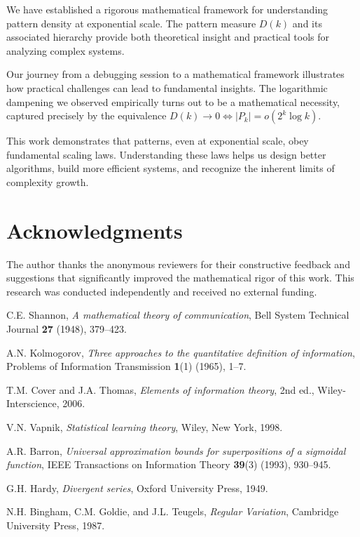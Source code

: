 \documentclass[11pt]{article}
\theoremstyle{definition}
\begin{document}
We have established a rigorous mathematical framework for understanding pattern density at exponential scale. The pattern measure $D(k)$ and its associated hierarchy provide both theoretical insight and practical tools for analyzing complex systems.

Our journey from a debugging session to a mathematical framework illustrates how practical challenges can lead to fundamental insights. The logarithmic dampening we observed empirically turns out to be a mathematical necessity, captured precisely by the equivalence $D(k)\to 0\iff |P_k|=o(2^k\log k)$.

This work demonstrates that patterns, even at exponential scale, obey fundamental scaling laws. Understanding these laws helps us design better algorithms, build more efficient systems, and recognize the inherent limits of complexity growth.

\section*{Acknowledgments}

The author thanks the anonymous reviewers for their constructive feedback and suggestions that significantly improved the mathematical rigor of this work. This research was conducted independently and received no external funding.

\begin{thebibliography}{99}

 C.E. Shannon, \emph{A mathematical theory of communication}, Bell System Technical Journal \textbf{27} (1948), 379--423.

 A.N. Kolmogorov, \emph{Three approaches to the quantitative definition of information}, Problems of Information Transmission \textbf{1}(1) (1965), 1--7.

 T.M. Cover and J.A. Thomas, \emph{Elements of information theory}, 2nd ed., Wiley-Interscience, 2006.

 V.N. Vapnik, \emph{Statistical learning theory}, Wiley, New York, 1998.

 A.R. Barron, \emph{Universal approximation bounds for superpositions of a sigmoidal function}, IEEE Transactions on Information Theory \textbf{39}(3) (1993), 930--945.

 G.H. Hardy, \emph{Divergent series}, Oxford University Press, 1949.

 N.H. Bingham, C.M. Goldie, and J.L. Teugels, \emph{Regular Variation}, Cambridge University Press, 1987.

\end{thebibliography}
\end{document}
